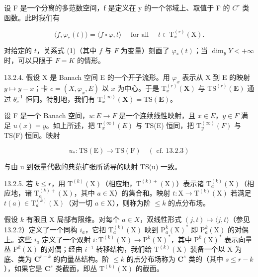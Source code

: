 设 F 是一个分离的多范数空间，f 是定义在 y 的一个邻域上、取值于 F 的 \(C^{r}\) 类函数。此时我们有

\[
\langle f, \varphi_ {*} (t) \rangle = \langle f \circ \varphi , t \rangle \quad \text {   for   all   } \quad t \in \mathrm{T} _ {x} ^ {(r)} (\mathrm{X}).\tag{1}
\]

对给定的 \(t\)，关系式 (1)（其中 \(f\) 与 \(F\) 为变量）刻画了 \(\varphi_{*}(t)\)；当 \(\dim_y Y < +\infty\) 时，可以只限于 \(F = K\) 的情形。

13.2.4. 假设 X 是 Banach 空间 E 的一个开子流形。用 \(\varphi_x\) 表示从 X 到 E 的映射 \(y \mapsto y - x\)；卡 \(c = (X, \varphi_x, E)\) 以 \(x\) 为中心。于是 \(\mathrm{T}_x^{(r)}(\mathbf{X})\) 与 \(\mathrm{TS}^{(r)}(\mathbf{E})\) 通过 \(\theta_c^{-1}\) 恒同。特别地，我们有 \(\mathrm{T}_x^{(\infty)}(\mathbf{X}) = \mathrm{TS}(\mathbf{E})\)。

设 F 是一个 Banach 空间，\(u: E \to F\) 是一个连续线性映射，且 \(x \in E\)，\(y \in F\) 满足 \(u(x) = y\)。如上所述，把 \(\mathrm{T}_{x}^{(\infty)}(E)\) 与 TS(E) 恒同，把 \(\mathrm{T}_{y}^{(\infty)}(F)\) 与 TS(F) 恒同。映射

\[
u _ {*} \colon \mathrm{TS(E)} \rightarrow \mathrm{TS(F)} \quad (\text { cf. } 13.2.3)
\]

与由 u 到张量代数的典范扩张所诱导的映射 TS(u) 一致。

13.2.5. 若 \(k \leqslant r\)，用 \(\mathrm{T}^{(k)}(\mathrm{X})\)（相应地，\(\mathrm{T}^{(k)+}(\mathrm{X})\)）表示诸 \(\mathrm{T}_a^{(k)}(\mathrm{X})\)（相应地，诸 \(\mathrm{T}_a^{(k)+}(\mathrm{X})\)，其中 \(a \in \mathrm{X}\)）的集合和。映射 \(t: \mathrm{X} \to \mathrm{T}^{(k)}(\mathrm{X})\) 若满足 \(t(a) \in \mathrm{T}_a^{(k)}(\mathrm{X})\)（对一切 \(a \in \mathrm{X}\)），则称为阶 \(\leqslant k\) 的点分布场。

假设 \(k\) 有限且 X 局部有限维。对每个 \(a \in X\)，双线性形式 \((j, t) \mapsto \langle j, t \rangle\)（参见 13.2.2）定义了一个同构 \(i_a\)，它把 \(\mathrm{T}_a^{(k)}(\mathrm{X})\) 映到 \(\mathrm{P}_a^k(\mathrm{X})^*\) 即 \(\mathrm{P}_a^k(\mathrm{X})\) 的对偶上。这些 \(i_a\) 定义了一个双射 \(i: \mathrm{T}^{(k)}(\mathrm{X}) \to \mathrm{P}^k(\mathrm{X})^*\)，其中 \(\mathrm{P}^k(\mathrm{X})^*\) 表示向量丛 \(\mathrm{P}^k(\mathrm{X})\) 的对偶；经由 \(i^{-1}\) 转移结构，我们给 \(\mathrm{T}^{(k)}(\mathrm{X})\) 装备一个以 X 为底、类为 \(\mathbf{C}^{r-k}\) 的向量丛结构。阶 \(\leqslant k\) 的点分布场称为 \(\mathbf{C}^s\) 类的（其中 \(s \leqslant r - k\)），如果它是 \(\mathbf{C}^s\) 类截面，即丛 \(\mathrm{T}^{(k)}(\mathrm{X})\) 的截面。

